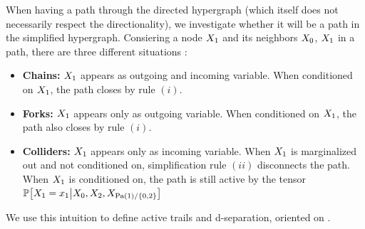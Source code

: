 When having a path through the directed hypergraph (which itself does not necessarily respect the directionality), we investigate whether it will be a path in the simplified hypergraph.
Consiering a node $X_{1}$ and its neighbors $X_{0}$, $X_{1}$ in a path, there are three different situations \cite{pearl_causality_2009}:
\begin{itemize}
    \item {\bf Chains:} $X_{1}$ appears as outgoing and incoming variable.
    When conditioned on $X_{1}$, the path closes by rule $(i)$.
    \item {\bf Forks:} $X_{1}$ appears only as outgoing variable.
    When conditioned on $X_{1}$, the path also closes by rule $(i)$.
    \item {\bf Colliders:} $X_{1}$ appears only as incoming variable. %
    When $X_{1}$ is marginalized out and not conditioned on, simplification rule $(ii)$ disconnects the path.
    When $X_{1}$ is conditioned on, the path is still active by the tensor $\mathbb{P}\big[X_{1}=x_{1}\big|X_{0},X_{2},X_{\mathrm{Pa}(1)/\{0,2\}}\big]$
\end{itemize}

We use this intuition to define active trails and d-separation, oriented on \cite[Def.~3.6 and Def.~3.7]{koller_probabilistic_2009}.

